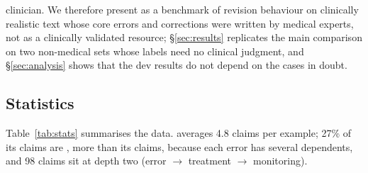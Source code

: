 clinician. We therefore present \ms{} as a benchmark of revision behaviour on clinically realistic text whose core errors and corrections were written by medical experts, not as a clinically validated resource; \S\ref{sec:results} replicates the main comparison on two non-medical sets whose labels need no clinical judgment, and \S\ref{sec:analysis} shows that the dev results do not depend on the cases in doubt.

\subsection{Statistics}
\begin{table}[t]
\centering\small
\setlength{\tabcolsep}{3pt}
\caption{Benchmark statistics. $^{\dagger}$\U{} triggers: evidence / dependency / feedback. \ms{} conditions: 154 each of valid, false, partial, authority-only, ambiguous, outdated; 9 superseding; 8 conflicting. Split by source case: 20 dev, 134 test (comparable in size to RevPropBench's 150 items). The pilot set is synthetic MIMIC-style chest X-ray reports and real COCO captions; a 24-example version with real IU X-ray reports exists but is not redistributed (CC BY-NC-ND).}
\label{tab:stats}
\end{table}

Table~\ref{tab:stats} summarises the data. \ms{} averages 4.8 claims per example; 27\% of its claims are \Pp{}, more than its \D{} claims, because each error has several dependents, and 98 \Pp{} claims sit at depth two (error $\to$ treatment $\to$ monitoring).

